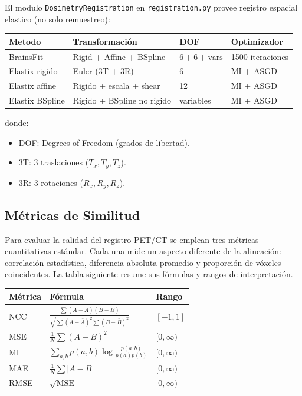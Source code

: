 \documentclass[12pt,a4paper]{article}
\begin{document}
El modulo \texttt{DosimetryRegistration} en \texttt{registration.py} provee registro espacial
elastico (no solo remuestreo):

\begin{table}[H]
\centering
\begin{tabular}{l l l l}
\toprule
\textbf{Metodo} & \textbf{Transformación} & \textbf{DOF} & \textbf{Optimizador} \\
\midrule
BrainsFit & Rigid + Affine + BSpline & $6 + 6 + \text{vars}$ & 1500 iteraciones \\
Elastix rigido & Euler (3T + 3R) & 6 & MI + ASGD \\
Elastix affine & Rigido + escala + shear & 12 & MI + ASGD \\
Elastix BSpline & Rigido + BSpline no rigido & variables & MI + ASGD \\
\bottomrule
\end{tabular}
\end{table}

donde:
\begin{itemize}
    \item DOF: Degrees of Freedom (grados de libertad).
    \item 3T: 3 traslaciones ($T_x, T_y, T_z$).
    \item 3R: 3 rotaciones ($R_x, R_y, R_z$).
\end{itemize}

\subsection{Métricas de Similitud}

Para evaluar la calidad del registro PET/CT se emplean tres métricas cuantitativas estándar. Cada una mide un aspecto diferente de la alineación: correlación estadística, diferencia absoluta promedio y proporción de vóxeles coincidentes. La tabla siguiente resume sus fórmulas y rangos de interpretación.

\begin{table}[H]
\centering
\begin{tabular}{l l l}
\toprule
\textbf{Métrica} & \textbf{Fórmula} & \textbf{Rango} \\
\midrule
NCC & $\displaystyle\frac{\sum (A-\bar{A})(B-\bar{B})}
                {\sqrt{\sum (A-\bar{A})^2 \sum (B-\bar{B})^2}}$ & $[-1, 1]$ \\
MSE & $\displaystyle\frac{1}{N}\sum (A-B)^2$ & $[0, \infty)$ \\
MI & $\displaystyle\sum_{a,b} p(a,b)\log\frac{p(a,b)}{p(a)p(b)}$ & $[0, \infty)$ \\
MAE & $\displaystyle\frac{1}{N}\sum |A-B|$ & $[0, \infty)$ \\
RMSE & $\sqrt{\text{MSE}}$ & $[0, \infty)$ \\
\bottomrule
\end{tabular}
\end{table}
\end{document}
